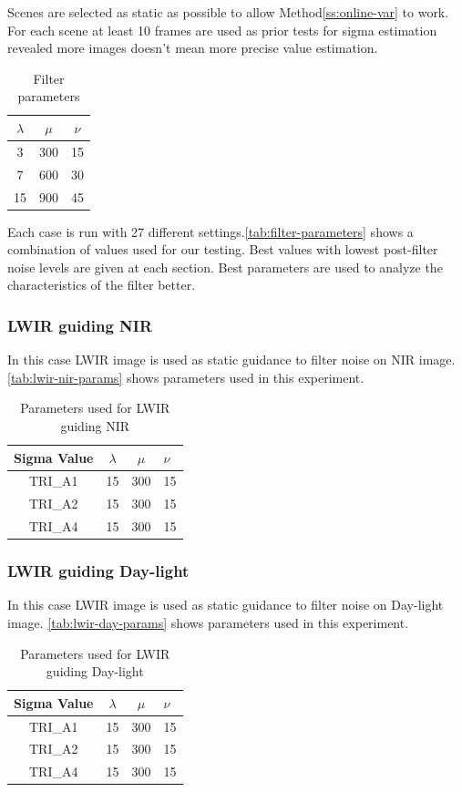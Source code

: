 \documentclass[10pt,twocolumn,letterpaper]{article}
\begin{document}
Scenes are selected as static as possible to allow Method\ref{ss:online-var} to work. For each scene at least 10 frames are used as prior tests for sigma estimation revealed more images doesn't mean more precise value estimation.
\begin{table}[!h]
	\centering
	\caption{Filter parameters}
	\label{tab:filter-parameters}
	\begin{tabular}{ccc}
		\hline
		\(\lambda\) & \(\mu\) & \(\nu\) \\ \hline
		3           & 300     & 15      \\
		7           & 600     & 30      \\
		15          & 900     & 45      \\ \hline
	\end{tabular}
\end{table}

Each case is run with 27 different settings.\autoref{tab:filter-parameters} shows a combination of values used for our testing. Best values with lowest post-filter noise levels are given at each section.
Best parameters are used to analyze the characteristics of the filter better.
\subsubsection{LWIR guiding NIR}
In this case LWIR image is used as static guidance to filter noise on NIR image. \autoref{tab:lwir-nir-params} shows parameters used in this experiment.
\begin{table}[!ht]
	\centering
	\caption{Parameters used for LWIR guiding NIR}
	\label{tab:lwir-nir-params}
	\begin{tabular}{@{}cccl@{}}
		\toprule
		\bfseries Sigma Value & \(\lambda\) & \(\mu\) & \(\nu\) \\ \midrule
		TRI\_A1               & 15        	& 300	  & 15       \\
		TRI\_A2               & 15       	& 300	  & 15       \\
		TRI\_A4               & 15        	& 300	  & 15       \\ \bottomrule
	\end{tabular}
\end{table}
\subsubsection{LWIR guiding Day-light}
In this case LWIR image is used as static guidance to filter noise on Day-light image. \autoref{tab:lwir-day-params} shows parameters used in this experiment.
\begin{table}[!ht]
	\centering
	\caption{Parameters used for LWIR guiding Day-light}
	\label{tab:lwir-day-params}
	\begin{tabular}{@{}cccl@{}}
		\toprule
		\bfseries Sigma Value & \(\lambda\) & \(\mu\) & \(\nu\) \\ \midrule
		TRI\_A1               & 15        	& 300	  & 15       \\
		TRI\_A2               & 15        	& 300	  & 15       \\
		TRI\_A4               & 15        	& 300	  & 15       \\ \bottomrule
	\end{tabular}
\end{table}
\end{document}
